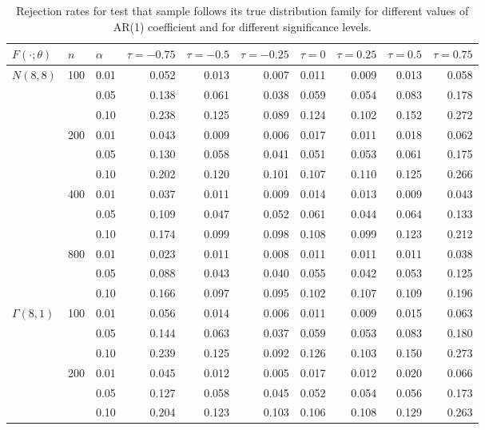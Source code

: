 \documentclass[APA,Times1COL]{WileyNJDv5} %
\begin{document}
\begin{table}[tbp]
\centering
\caption{Rejection rates for test that sample follows its true
                    distribution family for
                   different values of AR(1) coefficient and for different 
                   significance levels.} 
\label{table:size}
\begin{tabular}{lllrrrrrrr}
  \toprule
$F(\cdot; \theta)$ & $n$ & $\alpha$ & $\tau = -0.75$ & $\tau = -0.5$ & $\tau = -0.25$ 
& $\tau = 0$ & $\tau = 0.25$ & $\tau = 0.5$ & $\tau = 0.75$ \\ 
  \midrule
{$N(8,8)$} & {100} & 0.01 & 0.052 & 0.013& 0.007 & 0.011 & 0.009 & 0.013 & 0.058 \\ 
& & 0.05 & 0.138 & 0.061 & 0.038 & 0.059 & 0.054 & 0.083 & 0.178 \\ 
& & 0.10 & 0.238 & 0.125 & 0.089 & 0.124 & 0.102 & 0.152 & 0.272 \\ 
& {200} & 0.01 & 0.043 & 0.009 & 0.006 & 0.017 & 0.011 & 0.018 & 0.062 \\ 
& & 0.05 & 0.130 & 0.058 & 0.041 & 0.051 & 0.053 & 0.061 & 0.175 \\ 
& & 0.10 & 0.202 & 0.120 & 0.101 & 0.107 & 0.110 & 0.125 & 0.266 \\ 
& {400} & 0.01 & 0.037 & 0.011 & 0.009 & 0.014 & 0.013 & 0.009 & 0.043 \\ 
& & 0.05 & 0.109 & 0.047 & 0.052 & 0.061 & 0.044 & 0.064 & 0.133 \\ 
& & 0.10 & 0.174 & 0.099 & 0.098 & 0.108 & 0.099 & 0.123 & 0.212 \\ 
& {800} & 0.01 & 0.023 & 0.011 & 0.008 & 0.011 & 0.011 & 0.011 & 0.038 \\ 
& & 0.05 & 0.088 & 0.043 & 0.040 & 0.055 & 0.042 & 0.053 & 0.125 \\ 
& & 0.10 & 0.166 & 0.097 & 0.095 & 0.102 & 0.107 & 0.109 & 0.196 \\ [1ex]
{$\Gamma(8,1)$} & {100} & 0.01 & 0.056 & 0.014 & 0.006 & 0.011 & 0.009 & 0.015 & 0.063 \\
  & & 0.05 & 0.144 & 0.063 & 0.037 & 0.059 & 0.053 & 0.083 & 0.180 \\ 
  & & 0.10 & 0.239 & 0.125 & 0.092 & 0.126 & 0.103 & 0.150 & 0.273 \\ 
  & {200} & 0.01 & 0.045 & 0.012 & 0.005 & 0.017 & 0.012 & 0.020 & 0.066 \\ 
  & & 0.05 & 0.127 & 0.058 & 0.045 & 0.052 & 0.054 & 0.056 & 0.173 \\ 
  & & 0.10 & 0.204 & 0.123 & 0.103 & 0.106 & 0.108 & 0.129 & 0.263 \\ 

\end{tabular}
\end{table}
\end{document}
